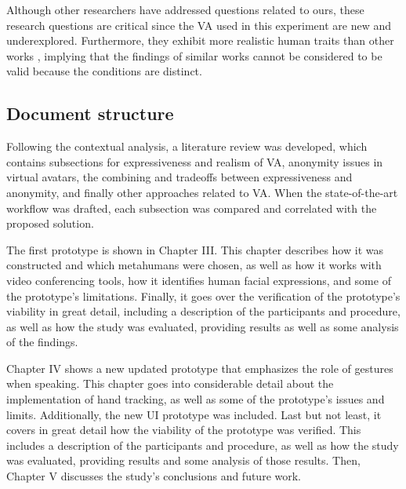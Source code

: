 Although other researchers have addressed questions related to ours, these research questions are critical since the VA used in this experiment are new and underexplored. Furthermore, they exhibit more realistic human traits than other works \cite{LU21, ZAL18, GRA07, LUC14, ROT19, KAN16, KAN10A, BAC19}, implying that the findings of similar works cannot be considered to be valid because the conditions are distinct.

\subsection{Document structure}
Following the contextual analysis, a literature review was developed, which contains subsections for expressiveness and realism of VA, anonymity issues in virtual avatars, the combining and tradeoffs between expressiveness and anonymity, and finally other approaches related to VA. When the state-of-the-art workflow was drafted, each subsection was compared and correlated with the proposed solution.

The first prototype is shown in Chapter III. This chapter describes how it was constructed and which metahumans were chosen, as well as how it works with video conferencing tools, how it identifies human facial expressions, and some of the prototype's limitations. Finally, it goes over the verification of the prototype's viability in great detail, including a description of the participants and procedure, as well as how the study was evaluated, providing results as well as some analysis of the findings.

Chapter IV shows a new updated prototype that emphasizes the role of gestures when speaking. This chapter goes into considerable detail about the implementation of hand tracking, as well as some of the prototype's issues and limits. Additionally, the new UI prototype was included. Last but not least, it covers in great detail how the viability of the prototype was verified. This includes a description of the participants and procedure, as well as how the study was evaluated, providing results and some analysis of those results. Then, Chapter V discusses the study's conclusions and future work.